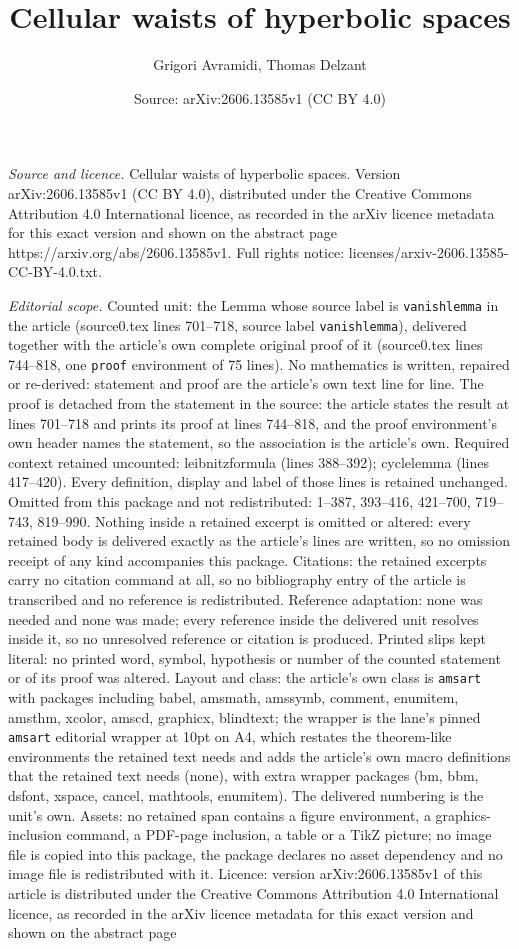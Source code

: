 \documentclass[10pt,a4paper]{amsart}
\title[Cellular waists of hyperbolic spaces]{Cellular waists of hyperbolic spaces}
\author{Grigori Avramidi, Thomas Delzant}
\date{Source: arXiv:2606.13585v1 (CC BY 4.0)}
\begin{document}
\maketitle

\noindent\emph{Source and licence.} Cellular waists of hyperbolic spaces. Version arXiv:2606.13585v1 (CC BY 4.0), distributed under the Creative Commons Attribution 4.0 International licence, as recorded in the arXiv licence metadata for this exact version and shown on the abstract page https://arxiv.org/abs/2606.13585v1. Full rights notice: licenses/arxiv-2606.13585-CC-BY-4.0.txt.\par\smallskip

\noindent\textit{Editorial scope.} Counted unit: the Lemma whose source label is \texttt{vanishlemma} in the article (source0.tex lines 701--718, source label \texttt{vanishlemma}), delivered together with the article's own complete original proof of it (source0.tex lines 744--818, one \texttt{proof} environment of 75 lines). No mathematics is written, repaired or re-derived: statement and proof are the article's own text line for line. The proof is detached from the statement in the source: the article states the result at lines 701--718 and prints its proof at lines 744--818, and the proof environment's own header names the statement, so the association is the article's own. Required context retained uncounted: leibnitzformula (lines 388--392); cyclelemma (lines 417--420). Every definition, display and label of those lines is retained unchanged. Omitted from this package and not redistributed: 1--387, 393--416, 421--700, 719--743, 819--990. Nothing inside a retained excerpt is omitted or altered: every retained body is delivered exactly as the article's lines are written, so no omission receipt of any kind accompanies this package. Citations: the retained excerpts carry no citation command at all, so no bibliography entry of the article is transcribed and no reference is redistributed. Reference adaptation: none was needed and none was made; every reference inside the delivered unit resolves inside it, so no unresolved reference or citation is produced. Printed slips kept literal: no printed word, symbol, hypothesis or number of the counted statement or of its proof was altered. Layout and class: the article's own class is \texttt{amsart} with packages including babel, amsmath, amssymb, comment, enumitem, amsthm, xcolor, amscd, graphicx, blindtext; the wrapper is the lane's pinned \texttt{amsart} editorial wrapper at 10pt on A4, which restates the theorem-like environments the retained text needs and adds the article's own macro definitions that the retained text needs (none), with extra wrapper packages (bm, bbm, dsfont, xspace, cancel, mathtools, enumitem). The delivered numbering is the unit's own. Assets: no retained span contains a figure environment, a graphics-inclusion command, a PDF-page inclusion, a table or a TikZ picture; no image file is copied into this package, the package declares no asset dependency and no image file is redistributed with it. Licence: version arXiv:2606.13585v1 of this article is distributed under the Creative Commons Attribution 4.0 International licence, as recorded in the arXiv licence metadata for this exact version and shown on the abstract page 
\end{document}
